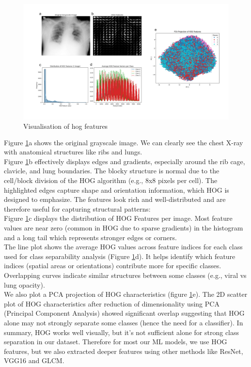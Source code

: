 \documentclass{article}
\begin{document}
\begin{figure}%
    \centering
    \includegraphics[width=1.0\linewidth]{hogfeatures_all.png}
    \caption{Visualisation of hog features}
    \label{fig:Visualisation of hog features}
\end{figure}
Figure \ref{fig:Visualisation of hog features}a shows the original grayscale image. We can clearly see the chest X-ray with anatomical structures like ribs and lungs.\\
Figure \ref{fig:Visualisation of hog features}b effectively displays edges and gradients, especially around the rib cage, clavicle, and lung boundaries. 
The blocky structure is normal due to the cell/block division of the HOG algorithm (e.g., 8x8 pixels per cell). The highlighted edges capture shape and 
orientation information, which HOG is designed to emphasize. The features look rich and well-distributed and are therefore useful for capturing structural patterns:\\
Figure \ref{fig:Visualisation of hog features}c displays the distribution of HOG Features per image. Most feature values are near zero (common in HOG due 
to sparse gradients) in the histogram and a long tail which represents stronger edges or corners.\\
The line plot shows the average HOG values across feature indices for each class used for class separability analysis 
(Figure \ref{fig:Visualisation of hog features}d). It helps identify which feature indices (spatial areas or orientations) contribute more for specific classes. 
Overlapping curves indicate similar structures between some classes (e.g., viral vs lung opacity).\\
We also plot a PCA projection of HOG characteristics (figure \ref{fig:Visualisation of hog features}e). The 2D scatter plot of HOG characteristics 
after reduction of dimensionality using PCA (Principal Component Analysis) showed significant overlap suggesting that HOG alone may not strongly separate 
some classes (hence the need for a classifier).
In summary, HOG works well visually, but it’s not sufficient alone for strong class separation in our dataset. Therefore for most our ML models, 
we use HOG features, but we also extracted deeper features using other methods like ResNet, VGG16 and GLCM.
\\
\end{document}
